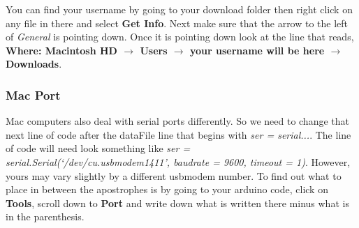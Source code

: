 You can find your username by going to your download folder then right click
on any file in there and select \textbf{Get Info}. Next make sure that the
arrow to the left of \textit{General} is pointing down. Once it is pointing
down look at the line that reads, \textbf{Where: Macintosh HD $\rightarrow $
Users $\rightarrow $ your username will be here $\rightarrow $ Downloads}.

\subsubsection{Mac Port}

Mac computers also deal with serial ports differently. So we need to change
that next line of code after the dataFile line that begins with \textit{ser
= serial...}. The line of code will need look something like \textit{ser =
serial.Serial(`/dev/cu.usbmodem1411', baudrate = 9600, timeout = 1)}.
However, yours may vary slightly by a different usbmodem number. To find out
what to place in between the apostrophes is by going to your arduino code,
click on \textbf{Tools}, scroll down to \textbf{Port} and write down what is
written there minus what is in the parenthesis.

